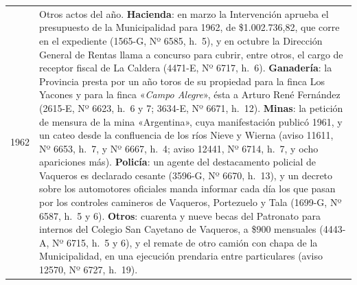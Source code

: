 \begin{longtable}{@{}p{2.7cm}p{10.3cm}@{}}
1962 & Otros actos del año. \textbf{Hacienda}: en marzo la Intervención aprueba el presupuesto de la Municipalidad para 1962, de \$1.002.736,82, que corre en el expediente (1565-G, Nº 6585, h.\ 5), y en octubre la Dirección General de Rentas llama a concurso para cubrir, entre otros, el cargo de receptor fiscal de La Caldera (4471-E, Nº 6717, h.\ 6). \textbf{Ganadería}: la Provincia presta por un año toros de su propiedad para la finca Los Yacones y para la finca «\textit{Campo Alegre}», ésta a Arturo René Fernández (2615-E, Nº 6623, h.\ 6 y 7; 3634-E, Nº 6671, h.\ 12). \textbf{Minas}: la petición de mensura de la mina «Argentina», cuya manifestación publicó 1961, y un cateo desde la confluencia de los ríos Nieve y Wierna (aviso 11611, Nº 6653, h.\ 7, y Nº 6667, h.\ 4; aviso 12441, Nº 6714, h.\ 7, y ocho apariciones más). \textbf{Policía}: un agente del destacamento policial de Vaqueros es declarado cesante (3596-G, Nº 6670, h.\ 13), y un decreto sobre los automotores oficiales manda informar cada día los que pasan por los controles camineros de Vaqueros, Portezuelo y Tala (1699-G, Nº 6587, h.\ 5 y 6). \textbf{Otros}: cuarenta y nueve becas del Patronato para internos del Colegio San Cayetano de Vaqueros, a \$900 mensuales (4443-A, Nº 6715, h.\ 5 y 6), y el remate de otro camión con chapa de la Municipalidad, en una ejecución prendaria entre particulares (aviso 12570, Nº 6727, h.\ 19). \\

\end{longtable}
